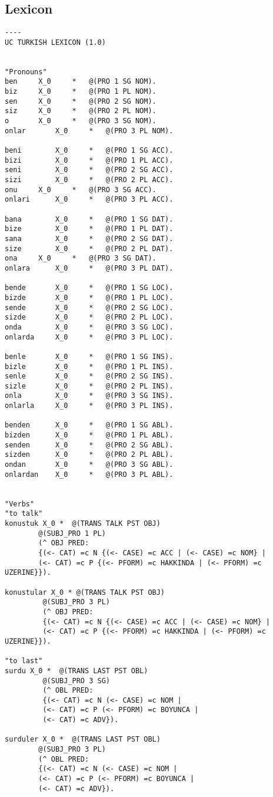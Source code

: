 \subsection{Lexicon}
\begin{lstlisting}
----
UC TURKISH LEXICON (1.0)


"Pronouns"
ben		X_0 	* 	@(PRO 1 SG NOM).	    			
biz		X_0 	* 	@(PRO 1 PL NOM).
sen		X_0 	* 	@(PRO 2 SG NOM).
siz		X_0 	* 	@(PRO 2 PL NOM).
o		X_0 	* 	@(PRO 3 SG NOM).
onlar		X_0 	* 	@(PRO 3 PL NOM).

beni		X_0 	* 	@(PRO 1 SG ACC).	    			
bizi		X_0 	* 	@(PRO 1 PL ACC).
seni		X_0 	* 	@(PRO 2 SG ACC).
sizi		X_0 	* 	@(PRO 2 PL ACC).
onu		X_0 	* 	@(PRO 3 SG ACC).
onlari		X_0 	* 	@(PRO 3 PL ACC).

bana		X_0 	* 	@(PRO 1 SG DAT).	    			
bize		X_0 	* 	@(PRO 1 PL DAT).
sana		X_0 	* 	@(PRO 2 SG DAT).
size		X_0 	* 	@(PRO 2 PL DAT).
ona		X_0 	* 	@(PRO 3 SG DAT).
onlara		X_0 	* 	@(PRO 3 PL DAT).

bende		X_0 	* 	@(PRO 1 SG LOC).	    			
bizde		X_0 	* 	@(PRO 1 PL LOC).
sende		X_0 	* 	@(PRO 2 SG LOC).
sizde		X_0 	* 	@(PRO 2 PL LOC).
onda		X_0 	* 	@(PRO 3 SG LOC).
onlarda		X_0 	* 	@(PRO 3 PL LOC).

benle		X_0 	* 	@(PRO 1 SG INS).	    			
bizle		X_0 	* 	@(PRO 1 PL INS).
senle		X_0 	* 	@(PRO 2 SG INS).
sizle		X_0 	* 	@(PRO 2 PL INS).
onla		X_0 	* 	@(PRO 3 SG INS).
onlarla		X_0 	* 	@(PRO 3 PL INS).

benden		X_0 	* 	@(PRO 1 SG ABL).	    			
bizden		X_0 	* 	@(PRO 1 PL ABL).
senden		X_0 	* 	@(PRO 2 SG ABL).
sizden		X_0 	* 	@(PRO 2 PL ABL).
ondan		X_0 	* 	@(PRO 3 SG ABL).
onlardan	X_0 	* 	@(PRO 3 PL ABL).


"Verbs"
"to talk"	    			
konustuk X_0 *  @(TRANS TALK PST OBJ)
		@(SUBJ_PRO 1 PL)
		(^ OBJ PRED: 
		{(<- CAT) =c N {(<- CASE) =c ACC | (<- CASE) =c NOM} | 
		(<- CAT) =c P {(<- PFORM) =c HAKKINDA | (<- PFORM) =c UZERINE}}).

konustular X_0 * @(TRANS TALK PST OBJ)
		 @(SUBJ_PRO 3 PL)
		 (^ OBJ PRED: 
		 {(<- CAT) =c N {(<- CASE) =c ACC | (<- CASE) =c NOM} | 
		 (<- CAT) =c P {(<- PFORM) =c HAKKINDA | (<- PFORM) =c UZERINE}}).

"to last"
surdu X_0 *  @(TRANS LAST PST OBL)
	     @(SUBJ_PRO 3 SG)
	     (^ OBL PRED: 
	     {(<- CAT) =c N (<- CASE) =c NOM | 
	     (<- CAT) =c P (<- PFORM) =c BOYUNCA |
	     (<- CAT) =c ADV}).

surduler X_0 *  @(TRANS LAST PST OBL)
		@(SUBJ_PRO 3 PL)
		(^ OBL PRED:
		{(<- CAT) =c N (<- CASE) =c NOM | 
		(<- CAT) =c P (<- PFORM) =c BOYUNCA |
		(<- CAT) =c ADV}).		


\end{lstlisting}
